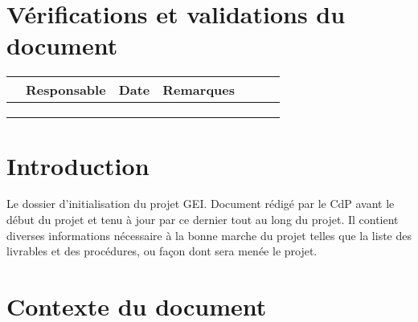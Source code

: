 \documentclass[twoside]{article}
\begin{document}

\section*{Vérifications et validations du document}

\begin{center}
\begin{longtable}{|m{15mm}|m{36mm}|m{36mm}|m{60mm}|}
\hline
 & Responsable & Date & Remarques\endhead \hline

& %

& %

& %

\\\hline

& %

& %

& %

\\\hline

& %

& %

& %

\\\hline

& %

& %

& %

\\\hline
\end{longtable}
\end{center}

\pagebreak


\section{Introduction}

Le dossier d'initialisation du projet GEI. Document rédigé par le CdP avant le 
début du projet et tenu à jour par ce dernier tout au long du projet. Il
contient diverses informations nécessaire à la bonne marche du projet telles que
la liste des livrables et des procédures, ou façon dont sera menée le projet.


\section{Contexte du document}
\end{document}
